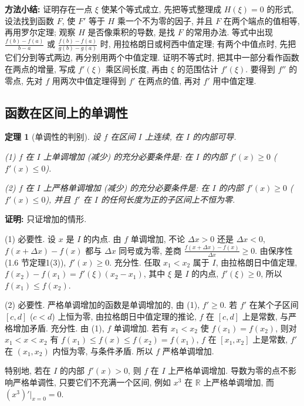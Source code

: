 \documentclass[UTF8,openany]{ctexbook}
\theoremstyle{chinesetextbook}
\newtheorem{theorem}{定理}[section]
\newenvironment{cnproof}{\par\indent\textbf{证明:} \ignorespaces}{\par}
\begin{document}
\par\indent\textbf{方法小结:} 证明存在一点 $\xi$ 使某个等式成立, 先把等式整理成 $H(\xi)=0$ 的形式, 设法找到函数 $F$, 使 $F'$ 等于 $H$ 乘一个不为零的因子, 并且 $F$ 在两个端点的值相等, 再用罗尔定理; 观察 $H$ 是否像乘积的导数, 是找 $F$ 的常用办法. 等式中出现 $\displaystyle\frac{f(b)-f(a)}{b-a}$ 或 $\displaystyle\frac{f(b)-f(a)}{g(b)-g(a)}$ 时, 用拉格朗日或柯西中值定理; 有两个中值点时, 先把它们分到等式两边, 再分别用两个中值定理. 证明不等式时, 把其中一部分看作函数在两点的增量, 写成 $f'(\xi)$ 乘区间长度, 再由 $\xi$ 的范围估计 $f'(\xi)$. 要得到 $f''$ 的零点, 先对 $f$ 用两次中值定理得到 $f'$ 在两点的值, 再对 $f'$ 用中值定理.
\subsection{函数在区间上的单调性}
\begin{theorem}[单调性的判别]\label{thm:c2-6-mono}
设 $f$ 在区间 $I$ 上连续, 在 $I$ 的内部可导.

\textup{(1)} $f$ 在 $I$ 上单调增加 (减少) 的充分必要条件是: 在 $I$ 的内部 $f'(x)\ge0$ ($f'(x)\le0$).

\textup{(2)} $f$ 在 $I$ 上严格单调增加 (减少) 的充分必要条件是: 在 $I$ 的内部 $f'(x)\ge0$ ($f'(x)\le0$), 并且 $f'$ 在 $I$ 的任何长度为正的子区间上不恒为零.
\end{theorem}
\begin{cnproof}
只证增加的情形.

(1) 必要性. 设 $x$ 是 $I$ 的内点. 由 $f$ 单调增加, 不论 $\Delta x>0$ 还是 $\Delta x<0$, $f(x+\Delta x)-f(x)$ 都与 $\Delta x$ 同号或为零, 差商 $\displaystyle\frac{f(x+\Delta x)-f(x)}{\Delta x}\ge0$. 由保序性 (1.6 节定理1(3)), $f'(x)\ge0$. 充分性. 任取 $x_1<x_2$ 属于 $I$, 由拉格朗日中值定理, $f(x_2)-f(x_1)=f'(\xi)(x_2-x_1)$, 其中 $\xi$ 是 $I$ 的内点, $f'(\xi)\ge0$, 所以 $f(x_1)\le f(x_2)$.

(2) 必要性. 严格单调增加的函数是单调增加的, 由 (1), $f'\ge0$. 若 $f'$ 在某个子区间 $[c,d]$ ($c<d$) 上恒为零, 由拉格朗日中值定理的推论, $f$ 在 $[c,d]$ 上是常数, 与严格增加矛盾. 充分性. 由 (1), $f$ 单调增加. 若有 $x_1<x_2$ 使 $f(x_1)=f(x_2)$, 则对 $x_1<x<x_2$ 有 $f(x_1)\le f(x)\le f(x_2)=f(x_1)$, $f$ 在 $[x_1,x_2]$ 上是常数, $f'$ 在 $(x_1,x_2)$ 内恒为零, 与条件矛盾. 所以 $f$ 严格单调增加.
\end{cnproof}
特别地, 若在 $I$ 的内部 $f'(x)>0$, 则 $f$ 在 $I$ 上严格单调增加. 导数为零的点不影响严格单调性, 只要它们不充满一个区间, 例如 $x^3$ 在 $\mathbb R$ 上严格单调增加, 而 $(x^3)'\big|_{x=0}=0$.
\end{document}

